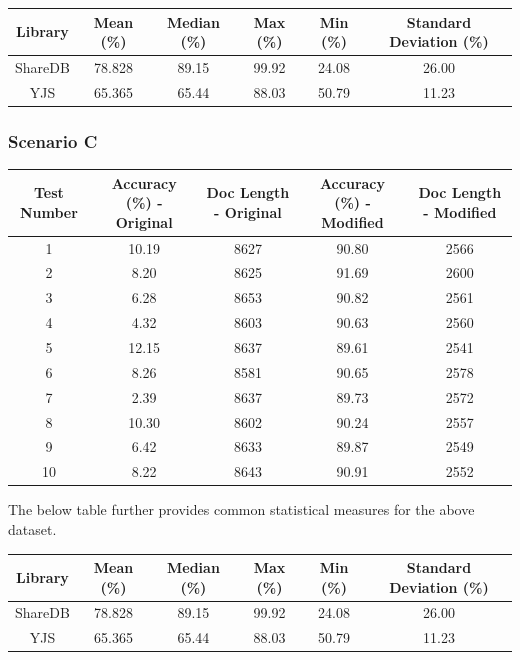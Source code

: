 \documentclass[9pt, titlepage]{article}
\begin{document}
  \begin{center}
    \begin{tabular}{||c c c c c c||} 
      \hline
      Library & Mean (\%) & Median (\%) & Max (\%) & Min (\%) & Standard Deviation (\%) \\ [0.5ex] 
      \hline\hline
      ShareDB & 78.828 & 89.15 & 99.92 & 24.08 & 26.00 \\ 
      \hline
      YJS & 65.365 & 65.44 & 88.03 & 50.79 & 11.23 \\
      \hline
    \end{tabular}
  \end{center}
  \hfill

  \subsubsection{Scenario C}
  
  \begin{center}
    \begin{tabular}{||c c c c c||} 
      \hline
      Test Number & Accuracy (\%) - Original & Doc Length - Original & Accuracy (\%) - Modified & Doc Length - Modified \\ [0.5ex] 
      \hline\hline
      1 & 10.19 & 8627 & 90.80 & 2566 \\ 
      \hline
      2 &  8.20 & 8625 & 91.69 & 2600 \\ 
      \hline
      3 &  6.28 & 8653 & 90.82 & 2561 \\ 
      \hline
      4 &  4.32 & 8603 & 90.63 & 2560 \\ 
      \hline
      5 & 12.15 & 8637 & 89.61 & 2541 \\ 
      \hline
      6 &  8.26 & 8581 & 90.65 & 2578 \\ 
      \hline
      7 &  2.39 & 8637 & 89.73 & 2572 \\ 
      \hline
      8 & 10.30 & 8602 & 90.24 & 2557 \\ 
      \hline
      9 &  6.42 & 8633 & 89.87 & 2549 \\ 
      \hline
      10 & 8.22 & 8643 & 90.91 & 2552 \\ 
      \hline
    \end{tabular}
  \end{center}
  
  The below table further provides common statistical measures for the above dataset.\\

  \begin{center}
    \begin{tabular}{||c c c c c c||} 
      \hline
      Library & Mean (\%) & Median (\%) & Max (\%) & Min (\%) & Standard Deviation (\%) \\ [0.5ex] 
      \hline\hline
      ShareDB & 78.828 & 89.15 & 99.92 & 24.08 & 26.00 \\ 
      \hline
      YJS & 65.365 & 65.44 & 88.03 & 50.79 & 11.23 \\
      \hline
    \end{tabular}
  \end{center}
  \hfill
\end{document}

